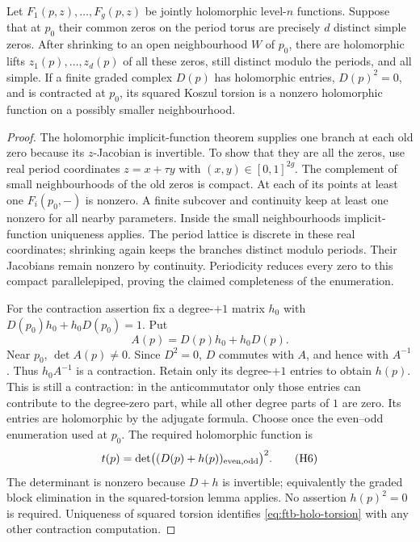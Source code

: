 \begin{srlemma}
\label{lem:ftb-holo-zeros-torsion}
Let \(F_1(p,z),\ldots,F_g(p,z)\) be jointly holomorphic level-\(n\)
functions.  Suppose that at \(p_0\) their common zeros on the
period torus are precisely \(d\) distinct simple zeros.
After shrinking to an open neighbourhood \(W\) of \(p_0\),
there are holomorphic lifts \(z_1(p),\ldots,z_d(p)\) of all these
zeros, still distinct modulo the periods, and all simple.
If a finite graded complex \(D(p)\) has holomorphic entries,
\(D(p)^2=0\), and is contracted at \(p_0\), its squared Koszul
torsion is a nonzero holomorphic function on a possibly smaller
neighbourhood.
\end{srlemma}
\begin{proof}
The holomorphic implicit-function theorem supplies one branch at
each old zero because its \(z\)-Jacobian is invertible.
To show that they are all the zeros, use real period coordinates
\(z=x+\tau y\) with \((x,y)\in[0,1]^{2g}\).
The complement of small neighbourhoods of the old zeros is
compact.  At each of its points at least one \(F_i(p_0,-)\)
is nonzero.  A finite subcover and continuity keep at least one
nonzero for all nearby parameters.  Inside the small
neighbourhoods implicit-function uniqueness applies.
The period lattice is discrete in these real coordinates;
shrinking again keeps the branches distinct modulo periods.
Their Jacobians remain nonzero by continuity.  Periodicity
reduces every zero to this compact parallelepiped, proving the
claimed completeness of the enumeration.

For the contraction assertion fix a degree-\(+1\) matrix \(h_0\)
with \(D(p_0)h_0+h_0D(p_0)=1\).  Put
\[
 A(p)=D(p)h_0+h_0D(p).
\]
Near \(p_0\), \(\det A(p)\ne0\).  Since \(D^2=0\), \(D\) commutes
with \(A\), and hence with \(A^{-1}\).  Thus
\(h_0A^{-1}\) is a contraction.  Retain only its degree-\(+1\)
entries to obtain \(h(p)\).  This is still a contraction:
in the anticommutator only those entries can contribute to
the degree-zero part, while all other degree parts of \(1\)
are zero.  Its entries are holomorphic by the adjugate formula.
Choose once the even--odd enumeration used at \(p_0\).
The required holomorphic function is
\[
             t(p)=\det\bigl((D(p)+h(p))_{\rm even,odd}\bigr)^2.
 \tag{H6}\label{eq:ftb-holo-torsion}
\]
The determinant is nonzero because \(D+h\) is invertible;
equivalently the graded block elimination in the squared-torsion
lemma applies.  No assertion \(h(p)^2=0\) is required.
Uniqueness of squared torsion identifies
\eqref{eq:ftb-holo-torsion} with any other contraction computation.
\end{proof}

